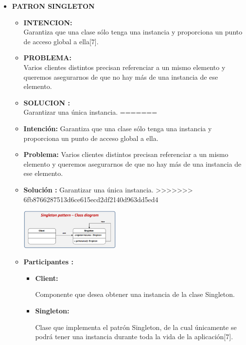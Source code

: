 \documentclass[twoside,twocolumn]{article}
\begin{document}
\begin{itemize}
\begin{itemize}
	\item \textbf{PATRON SINGLETON}
	\begin{itemize}
<<<<<<< HEAD
		\item \textbf{INTENCION:}\\Garantiza que una clase sólo tenga una instancia y proporciona un punto de acceso global a ella[7]. 

		\item \textbf{PROBLEMA:}\\ Varios clientes distintos precisan referenciar a un mismo elemento y queremos asegurarnos de que no hay más de una instancia de ese elemento. 

		\item \textbf{SOLUCION :}\\ Garantizar una única instancia. 
=======
		\item \textbf{Intención:}	Garantiza que una clase sólo tenga una instancia y proporciona un punto de acceso global a ella. 

		\item \textbf{Problema:} Varios clientes distintos precisan referenciar a un mismo elemento y queremos asegurarnos de que no hay más de una instancia de ese elemento. 

		\item \textbf{Solución :} Garantizar una única instancia. 
>>>>>>> 6fb8766287513d6ce615ecd2df2140d963dd5ed4
			\begin{center}
			    \includegraphics[width=5cm]{./img/imagen1.png} 
            \end{center}
		\item \textbf{Participantes :}	
        \begin{itemize}
<<<<<<< HEAD
            \item \textbf{	Client:}	
            \begin{itemize}
                Componente que desea obtener una instancia de la clase Singleton.
            \end{itemize}
        \item \textbf{Singleton:}	
            \begin{itemize}
                Clase que implementa el patrón Singleton, de la cual únicamente se podrá tener una instancia durante toda la vida de la aplicación[7].  	
            \end{itemize}
        \end{itemize}    


\end{itemize}
\end{itemize}
\end{itemize}
\end{document}

